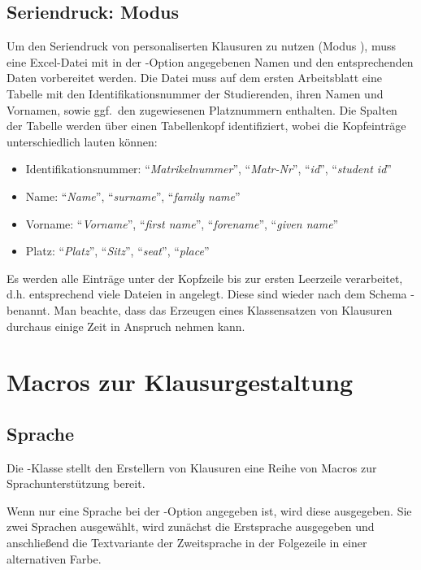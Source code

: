 \documentclass[
load=osgexam,
babel=ngerman
]{skdoc}
\begin{document}
\subsection{Seriendruck: Modus }
\label{sec:series} 
Um den Seriendruck von personaliserten Klausuren zu nutzen (Modus ), muss eine Excel-Datei mit in der
-Option angegebenen Namen und den entsprechenden Daten vorbereitet werden.
 Die Datei muss auf dem ersten Arbeitsblatt eine Tabelle mit den Identifikationsnummer der
Studierenden, ihren Namen und Vornamen, sowie ggf.\ den zugewiesenen Platznummern enthalten. Die Spalten der Tabelle
werden über einen Tabellenkopf identifiziert, wobei die Kopfeinträge unterschiedlich lauten können:
\begin{itemize}[nosep]
  \item Identifikationsnummer: ``\emph{Matrikelnummer}'', ``\emph{Matr-Nr}'', ``\emph{id}'', ``\emph{student id}''
  \item Name: ``\emph{Name}'', ``\emph{surname}'', ``\emph{family name}''
  \item Vorname: ``\emph{Vorname}'', ``\emph{first name}'', ``\emph{forename}'', ``\emph{given name}''
  \item Platz: ``\emph{Platz}'', ``\emph{Sitz}'', ``\emph{seat}'', ``\emph{place}''
\end{itemize}
Es werden alle Einträge unter der Kopfzeile bis zur ersten Leerzeile verarbeitet, d.\;h. entsprechend viele Dateien in
 angelegt. Diese sind wieder nach dem Schema - benannt.
Man beachte, dass das Erzeugen eines Klassensatzen von Klausuren durchaus einige Zeit in Anspruch nehmen kann.

\section{Macros zur Klausurgestaltung}
\subsection{Sprache}
\label{sec:macro:lang}
Die \thepkg-Klasse stellt den Erstellern von Klausuren eine Reihe von Macros zur Sprachunterstützung bereit.

\DescribeMacro{} Wenn nur eine Sprache bei der
-Option angegeben ist, wird diese ausgegeben. Sie zwei Sprachen ausgewählt, wird zunächst die Erstsprache
ausgegeben und anschließend die Textvariante der Zweitsprache in der Folgezeile in einer alternativen Farbe.
\medskip
\end{document}

